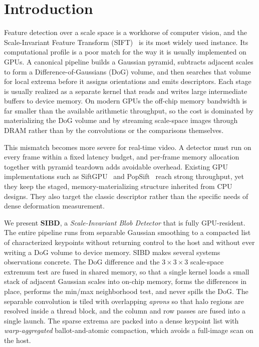 
\section{Introduction}
\label{sec:intro}

Feature detection over a scale space is a workhorse of computer vision, and the
Scale-Invariant Feature Transform (SIFT)~\cite{lowe2004} is its most widely used
instance. Its computational profile is a poor match for the way it is usually
implemented on GPUs. A canonical pipeline builds a Gaussian pyramid, subtracts
adjacent scales to form a Difference-of-Gaussians (DoG) volume, and then
searches that volume for local extrema before it assigns orientations and emits
descriptors. Each stage is usually realized as a separate kernel that reads and
writes large intermediate buffers to device memory. On modern GPUs the off-chip
memory bandwidth is far smaller than the available arithmetic throughput, so the
cost is dominated by materializing the DoG volume and by streaming scale-space
images through DRAM rather than by the convolutions or the comparisons
themselves.

This mismatch becomes more severe for real-time video. A detector must run on
every frame within a fixed latency budget, and per-frame memory allocation
together with pyramid teardown adds avoidable overhead. Existing GPU
implementations such as SiftGPU~\cite{siftgpu} and PopSift~\cite{popsift} reach
strong throughput, yet they keep the staged, memory-materializing structure
inherited from CPU designs. They also target the classic descriptor rather than
the specific needs of dense deformation measurement.

We present \textbf{SIBD}, a \emph{Scale-Invariant Blob Detector} that is fully
GPU-resident. The entire pipeline runs from separable Gaussian smoothing to a
compacted list of characterized keypoints without returning control to the host
and without ever writing a DoG volume to device memory. SIBD makes several
systems observations concrete. The DoG difference and the $3\times3\times3$
scale-space extremum test are fused in shared memory, so that a single kernel
loads a small stack of adjacent Gaussian scales into on-chip memory, forms the
differences in place, performs the min/max neighborhood test, and never spills
the DoG. The separable convolution is tiled with overlapping \emph{aprons} so
that halo regions are resolved inside a thread block, and the column and row
passes are fused into a single launch. The sparse extrema are packed into a
dense keypoint list with \emph{warp-aggregated} ballot-and-atomic compaction,
which avoids a full-image scan on the host.

